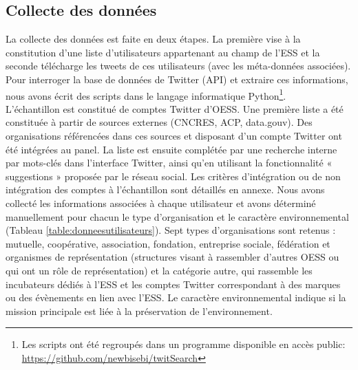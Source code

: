 


\subsection{Collecte des données}
    \label{twitter:collecte}
    La collecte des données est faite en deux étapes. La première vise à la constitution d’une liste d’utilisateurs appartenant au champ de l’ESS et la seconde télécharge les tweets de ces utilisateurs (avec les méta-données associées). Pour interroger la base de données de Twitter (API) et extraire ces informations, nous avons écrit des scripts dans le langage informatique Python\footnote{Les scripts ont été regroupés dans un programme disponible en accès public: \url{https://github.com/newbisebi/twitSearch}}. \\

    L’échantillon est constitué de comptes Twitter d’OESS. Une première liste a été constituée à partir de sources externes (CNCRES, ACP, data.gouv). Des organisations référencées dans ces sources et disposant d’un compte Twitter ont été intégrées au panel. La liste est ensuite complétée par une recherche interne par mots-clés dans l’interface Twitter, ainsi qu’en utilisant la fonctionnalité « suggestions » proposée par le réseau social. Les critères d’intégration ou de non intégration des comptes à l’échantillon sont détaillés en annexe. Nous avons collecté les informations associées à chaque utilisateur et avons déterminé manuellement pour chacun le type d’organisation et le caractère environnemental (Tableau \ref{table:donneesutilisateurs}). Sept types d’organisations sont retenus : mutuelle, coopérative, association, fondation, entreprise sociale, fédération et organismes de représentation (structures visant à rassembler d’autres OESS ou qui ont un rôle de représentation) et la catégorie autre, qui rassemble les incubateurs dédiés à l’ESS et les comptes Twitter correspondant à des marques ou des évènements en lien avec l’ESS. Le caractère environnemental indique si la mission principale est liée à la préservation de l’environnement. \\


